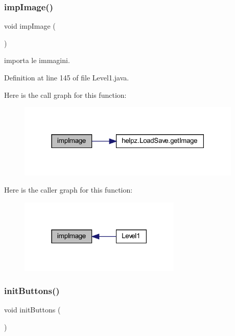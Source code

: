 \subsubsection{\texorpdfstring{imp\+Image()}{impImage()}}
{\footnotesize\ttfamily void imp\+Image (\begin{DoxyParamCaption}{ }\end{DoxyParamCaption})\hspace{0.3cm}{\ttfamily [private]}}



importa le immagini. 



Definition at line 145 of file Level1.\+java.

Here is the call graph for this function\+:
\nopagebreak
\begin{figure}[H]
\begin{center}
\leavevmode
\includegraphics[width=303pt]{classscenes_1_1_level1_aded9c531b53772fd90d09a8b6bf0132e_cgraph}
\end{center}
\end{figure}
Here is the caller graph for this function\+:\nopagebreak
\begin{figure}[H]
\begin{center}
\leavevmode
\includegraphics[width=219pt]{classscenes_1_1_level1_aded9c531b53772fd90d09a8b6bf0132e_icgraph}
\end{center}
\end{figure}
\mbox{\label{classscenes_1_1_level1_a27d3ba5afb772cc36c9a432c28975ace}} 
\subsubsection{\texorpdfstring{init\+Buttons()}{initButtons()}}
{\footnotesize\ttfamily void init\+Buttons (\begin{DoxyParamCaption}{ }\end{DoxyParamCaption})\hspace{0.3cm}{\ttfamily [private]}}



